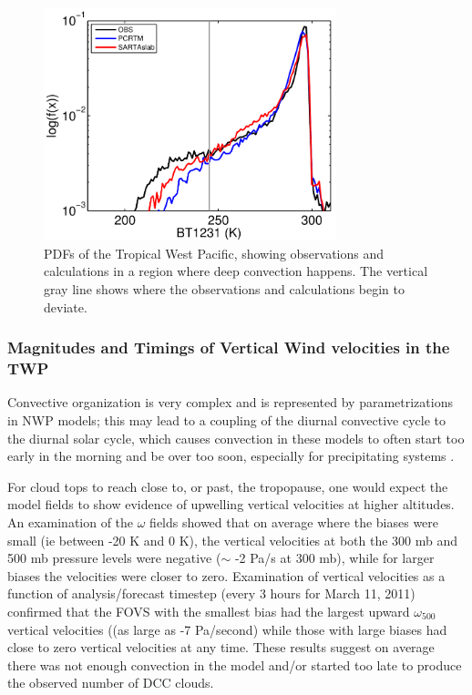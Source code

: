 \documentclass[agupp]{aguplus}              %
\begin{document}
\begin{article}
\begin{figure}[h]
\noindent\includegraphics[width=20pc]{FIGS/ecm_cloudBT1231_gev_dcc}
\caption{PDFs of the Tropical West Pacific, showing observations and
calculations in a region where deep convection happens. The vertical
gray line shows where the observations and calculations begin to deviate.}
\label{dcc_pdf} 
\end{figure}

\subsubsection{Magnitudes and Timings of Vertical Wind velocities in the TWP}

Convective organization is very complex and is represented by
parametrizations in NWP models; this may lead to a coupling of the
diurnal convective cycle to the diurnal solar cycle, which causes
convection in these models to often start too early in the morning and
be over too soon, especially for precipitating systems \citep{inn:13}.

For cloud tops to reach close to, or past, the tropopause, one would
expect the model fields to show evidence of upwelling vertical
velocities at higher altitudes. An examination of the $\omega$ fields
showed that on average where the biases were small (ie between -20 K
and 0 K), the vertical velocities at both the 300 mb and 500 mb
pressure levels were negative ($\sim$ -2 Pa/s at 300 mb), while for
larger biases the velocities were closer to zero. Examination of
vertical velocities as a function of analysis/forecast timestep (every 3 hours for
March 11, 2011) confirmed that the FOVS with the smallest bias had the
largest upward  $\omega_{500}$  vertical velocities ((as large as -7 Pa/second)
while those with large biases had close to zero vertical velocities at any time. 
These results suggest on average there was not enough convection in the
model and/or started too late to produce the observed number of DCC
clouds.


\end{article}
\end{document}
